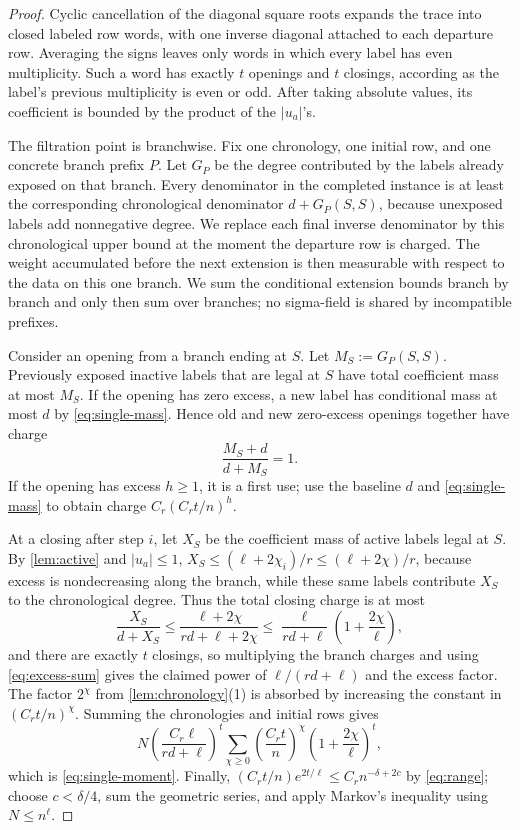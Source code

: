 \documentclass[11pt]{article}
\theoremstyle{definition}
\theoremstyle{remark}
\newcommand{\1}{\mathbf 1}
\numberwithin{equation}{section}
\begin{document}
\begin{proof}
Cyclic cancellation of the diagonal square roots expands the trace into
closed labeled row words, with one inverse diagonal attached to each
departure row.  Averaging the signs leaves only words in which every label
has even multiplicity.  Such a word has exactly $t$ openings and $t$
closings, according as the label's previous multiplicity is even or odd.
After taking absolute values, its coefficient is bounded by the product of
the $|u_a|$'s.

The filtration point is branchwise.  Fix one chronology, one initial row,
and one concrete branch prefix $P$.  Let $G_P$ be the degree contributed by
the labels already exposed on that branch.  Every denominator in the
completed instance is at least the corresponding chronological denominator
$d+G_P(S,S)$, because unexposed labels add nonnegative degree.  We replace
each final inverse denominator by this chronological upper bound at the
moment the departure row is charged.  The weight accumulated before the
next extension is then measurable with respect to the data on this one
branch.  We sum the conditional extension bounds branch by branch and only
then sum over branches; no sigma-field is shared by incompatible prefixes.

Consider an opening from a branch ending at $S$.  Let
$M_S:=G_P(S,S)$.  Previously exposed inactive labels that are legal at
$S$ have total coefficient mass at most $M_S$.  If the opening has zero
excess, a new label has conditional mass at most $d$ by
\cref{eq:single-mass}.  Hence old and new zero-excess openings together
have charge
\[
 \frac{M_S+d}{d+M_S}=1.
\]
If the opening has excess $h\ge1$, it is a first use; use the baseline
$d$ and \cref{eq:single-mass} to obtain charge
$C_r(C_rt/n)^h$.

At a closing after step $i$, let $X_S$ be the coefficient mass of active
labels legal at $S$.  By \cref{lem:active} and $|u_a|\le1$,
$X_S\le(\ell+2\chi_i)/r\le(\ell+2\chi)/r$, because excess is
nondecreasing along the branch, while these same labels contribute $X_S$
to the chronological degree.  Thus the total closing charge is at most
\[
 \frac{X_S}{d+X_S}
 \le\frac{\ell+2\chi}{rd+\ell+2\chi}
 \le \frac{\ell}{rd+\ell}
      \left(1+\frac{2\chi}{\ell}\right),
\]
and there are exactly $t$ closings, so
multiplying the branch charges and using \cref{eq:excess-sum} gives the
claimed power of $\ell/(rd+\ell)$ and the excess factor.  The factor
$2^\chi$ from \cref{lem:chronology}(1) is absorbed by increasing the
constant in $(C_rt/n)^\chi$.  Summing the chronologies and initial rows
gives
\[
 N\left(\frac{C_r\ell}{rd+\ell}\right)^t
 \sum_{\chi\ge0}
 \left(\frac{C_rt}{n}\right)^\chi
 \left(1+\frac{2\chi}{\ell}\right)^t,
\]
which is \cref{eq:single-moment}.  Finally,
$(C_rt/n)e^{2t/\ell}\le C_rn^{-\delta+2c}$ by \cref{eq:range}; choose
$c<\delta/4$, sum the geometric series, and apply Markov's inequality
using $N\le n^\ell$.
\end{proof}
\end{document}
